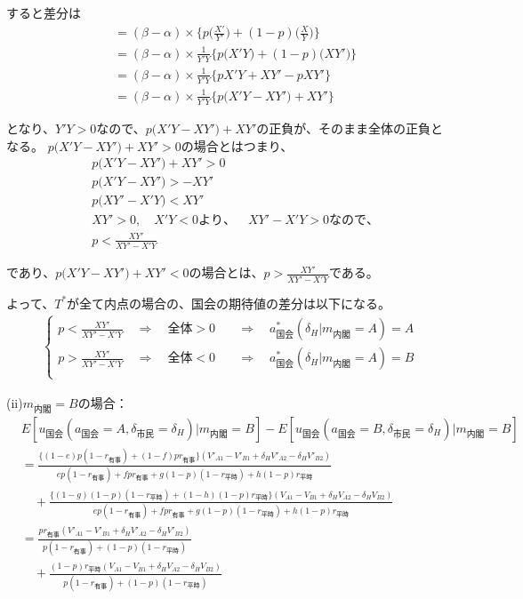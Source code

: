 \documentclass[main.tex]{subfiles}
\begin{document}
すると差分は
\begin{align*}
    &= (\beta - \alpha) × \Big\{  p \Big( \frac{X'}{Y'} \Big) +(1-p) \Big(  \frac{X}{Y} \Big) \Big\}\\[1em]
    &= (\beta - \alpha) × \frac{1}{Y'Y} \Big\{  p \Big( X'Y \Big) +(1-p) \Big(  XY' \Big) \Big\}\\[1em]
    &= (\beta - \alpha) × \frac{1}{Y'Y} \Big\{  p X'Y  + XY' -p XY'  \Big\}\\[1em]
    &= (\beta - \alpha) × \frac{1}{Y'Y} \Big\{  p \Big( X'Y - XY' \Big) + XY'   \Big\}
\end{align*}

となり、$Y'Y>0$なので、$ p \Big( X'Y - XY' \Big) + XY'$の正負が、そのまま全体の正負となる。
$p \Big( X'Y - XY' \Big) + XY'>0$の場合とはつまり、
\begin{align*}
    & p \Big( X'Y - XY' \Big) + XY' > 0\\
    & p \Big( X'Y - XY' \Big)  > -  XY'\\
    & p \Big(XY' - X'Y  \Big)  <  XY'\\[0.5em]
    & XY'>0,\quad X'Y<0より、\quad XY' - X'Y>0なので、\\[1em]
    & p   <  \frac{XY'}{XY' - X'Y}
\end{align*}

であり、$p \Big( X'Y - XY' \Big) + XY'<0$の場合とは、$p   >  \frac{XY'}{XY' - X'Y}$である。


よって、$T^*$が全て内点の場合の、国会の期待値の差分は以下になる。
\begin{align*}
    \begin{cases}
        p < \frac{XY'}{XY' - X'Y} \quad\Rightarrow\quad 全体>0 &\quad\Rightarrow\quad a^*_{国会}(\delta_H|m_{内閣} = A) = A\\[0.5em]
        p > \frac{XY'}{XY' - X'Y} \quad\Rightarrow\quad 全体<0 &\quad\Rightarrow\quad a^*_{国会}(\delta_H|m_{内閣} = A) = B\\[0.5em] 
     \end{cases}
\end{align*}


\bigskip
(ii)$m_{内閣}=B$の場合：
\begin{align*}
    & E[u_{国会}(a_{国会}=A, \delta_{市民}=\delta_H) | m_{内閣} = B  ] - E[u_{国会}(a_{国会}=B, \delta_{市民}=\delta_H) | m_{内閣} = B  ]\\[1em]
    &= \frac{ \{(1-e)p(1-r_{有事}) +  (1-f)pr_{有事}\}(V'_{A1} -V'_{B1} + \delta_H V'_{A2} - \delta_H V'_{B2})  }{ ep(1-r_{有事}) + fpr_{有事} + g(1-p)(1-r_{平時}) + h(1-p)r_{平時} }\\[1em]
    &\quad + \frac{ \{(1-g)(1-p)(1-r_{平時}) + (1-h)(1-p)r_{平時}\}(V_{A1} - V_{B1} + \delta_H V_{A2} - \delta_H V_{B2} ) }{ ep(1-r_{有事}) + fpr_{有事} + g(1-p)(1-r_{平時}) + h(1-p)r_{平時} }\\[1em]
    &= \frac{  pr_{有事}(V'_{A1} -V'_{B1} + \delta_H V'_{A2} - \delta_H V'_{B2})  }{ p(1-r_{有事}) +(1-p)(1-r_{平時})  }\\[1em]
    &\quad + \frac{ (1-p)r_{平時}(V_{A1} - V_{B1} + \delta_H V_{A2} - \delta_H V_{B2} ) }{ p(1-r_{有事}) + (1-p)(1-r_{平時})  }
\end{align*}
\end{document}
